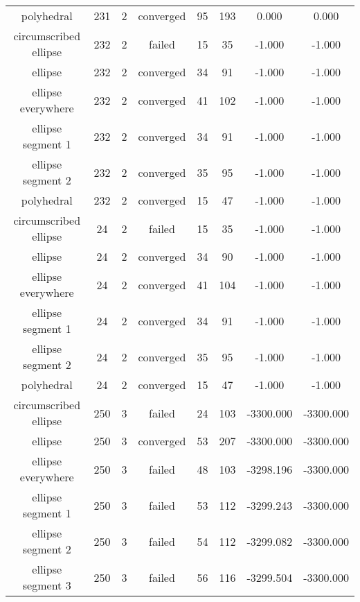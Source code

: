 \begin{scriptsize}
\begin{center}
\begin{longtable}{ c c c c c c c c }
        polyhedral        &  231  &  2  & converged  &   95  &  193  &   0.000    &   0.000    \\
  circumscribed ellipse   &  232  &  2  &   failed   &   15  &   35  &   -1.000   &   -1.000   \\
         ellipse          &  232  &  2  & converged  &   34  &   91  &   -1.000   &   -1.000   \\
    ellipse everywhere    &  232  &  2  & converged  &   41  &  102  &   -1.000   &   -1.000   \\
    ellipse segment 1     &  232  &  2  & converged  &   34  &   91  &   -1.000   &   -1.000   \\
    ellipse segment 2     &  232  &  2  & converged  &   35  &   95  &   -1.000   &   -1.000   \\
        polyhedral        &  232  &  2  & converged  &   15  &   47  &   -1.000   &   -1.000   \\
  circumscribed ellipse   &   24  &  2  &   failed   &   15  &   35  &   -1.000   &   -1.000   \\
         ellipse          &   24  &  2  & converged  &   34  &   90  &   -1.000   &   -1.000   \\
    ellipse everywhere    &   24  &  2  & converged  &   41  &  104  &   -1.000   &   -1.000   \\
    ellipse segment 1     &   24  &  2  & converged  &   34  &   91  &   -1.000   &   -1.000   \\
    ellipse segment 2     &   24  &  2  & converged  &   35  &   95  &   -1.000   &   -1.000   \\
        polyhedral        &   24  &  2  & converged  &   15  &   47  &   -1.000   &   -1.000   \\
  circumscribed ellipse   &  250  &  3  &   failed   &   24  &  103  & -3300.000  & -3300.000  \\
         ellipse          &  250  &  3  & converged  &   53  &  207  & -3300.000  & -3300.000  \\
    ellipse everywhere    &  250  &  3  &   failed   &   48  &  103  & -3298.196  & -3300.000  \\
    ellipse segment 1     &  250  &  3  &   failed   &   53  &  112  & -3299.243  & -3300.000  \\
    ellipse segment 2     &  250  &  3  &   failed   &   54  &  112  & -3299.082  & -3300.000  \\
    ellipse segment 3     &  250  &  3  &   failed   &   56  &  116  & -3299.504  & -3300.000  \\

\end{longtable}
\end{center}
\end{scriptsize}
